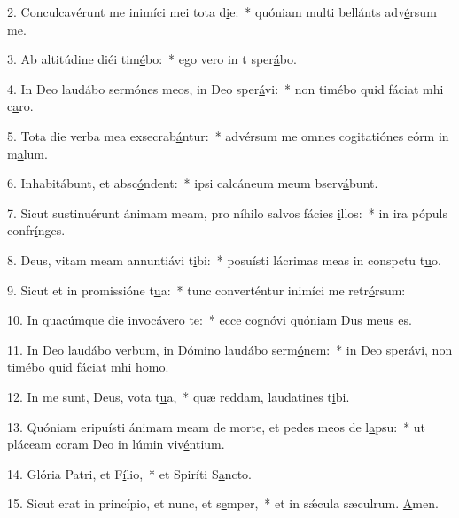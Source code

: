 2. Conculcavérunt me inimíci mei tota d\uline{i}e:~* quóniam multi bellánts adv\uline{é}rsum me.\par 
3. Ab altitúdine diéi tim\uline{é}bo:~* ego vero in t sper\uline{á}bo.\par 
4. In Deo laudábo sermónes meos, in Deo sper\uline{á}vi:~* non timébo quid fáciat mhi c\uline{a}ro.\par 
5. Tota die verba mea exsecrab\uline{á}ntur:~* advérsum me omnes cogitatiónes eórm in m\uline{a}lum.\par 
6. Inhabitábunt, et absc\uline{ó}ndent:~* ipsi calcáneum meum bserv\uline{á}bunt.\par 
7. Sicut sustinuérunt ánimam meam, pro níhilo salvos fácies \uline{i}llos:~* in ira pópuls confr\uline{í}nges.\par 
8. Deus, vitam meam annuntiávi t\uline{i}bi:~* posuísti lácrimas meas in conspctu t\uline{u}o.\par 
9. Sicut et in promissióne t\uline{u}a:~* tunc converténtur inimíci me retr\uline{ó}rsum:\par 
10. In quacúmque die invocáver\uline{o} te:~* ecce cognóvi quóniam Dus m\uline{e}us es.\par 
11. In Deo laudábo verbum, in Dómino laudábo serm\uline{ó}nem:~* in Deo sperávi, non timébo quid fáciat mhi h\uline{o}mo.\par 
12. In me sunt, Deus, vota t\uline{u}a,~* quæ reddam, laudatines t\uline{i}bi.\par 
13. Quóniam eripuísti ánimam meam de morte, et pedes meos de l\uline{a}psu:~* ut pláceam coram Deo in lúmin viv\uline{é}ntium.\par 
14. Glória Patri, et F\uline{í}lio,~* et Spiríti S\uline{a}ncto.\par 
15. Sicut erat in princípio, et nunc, et s\uline{e}mper,~* et in sǽcula sæculrum. \uline{A}men.\par 
